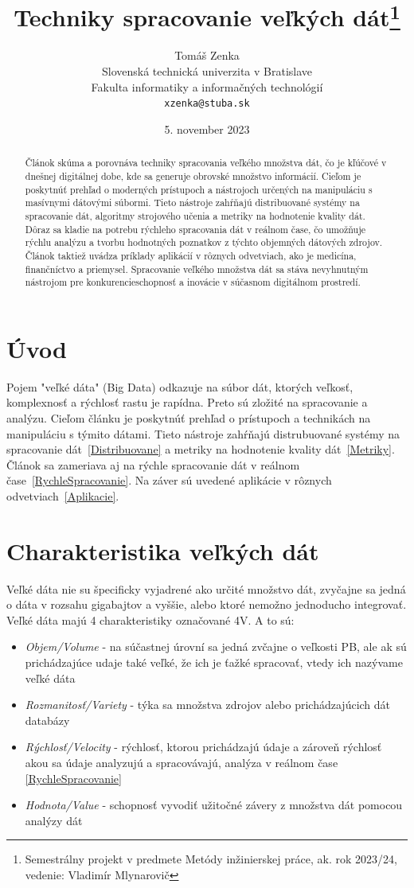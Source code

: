\documentclass[10pt,slovak,a4paper]{article}
\title{Techniky spracovanie veľkých dát\thanks{Semestrálny projekt v predmete Metódy inžinierskej práce, ak. rok 2023/24, vedenie: Vladimír Mlynarovič}} %
\author{Tomáš Zenka\\[2pt]
	{\small Slovenská technická univerzita v Bratislave}\\
	{\small Fakulta informatiky a informačných technológií}\\
	{\small \texttt{xzenka@stuba.sk}}
	}
\date{\small 5. november 2023} %
\begin{document}
\maketitle

\begin{abstract}
Článok skúma a porovnáva techniky spracovania veľkého množstva dát, čo je kľúčové v dnešnej digitálnej dobe, kde sa generuje obrovské množstvo informácií. Cieľom je poskytnúť prehľad o moderných prístupoch a nástrojoch určených na manipuláciu s masívnymi dátovými súbormi. Tieto nástroje zahŕňajú distribuované systémy na spracovanie dát, algoritmy strojového učenia a metriky na hodnotenie kvality dát. Dôraz sa kladie na potrebu rýchleho spracovania dát v reálnom čase, čo umožňuje rýchlu analýzu a tvorbu hodnotných poznatkov z týchto objemných dátových zdrojov. Článok taktiež uvádza príklady aplikácií v rôznych odvetviach, ako je medicína, finančníctvo a priemysel. Spracovanie veľkého množstva dát sa stáva nevyhnutným nástrojom pre konkurencieschopnosť a inovácie v súčasnom digitálnom prostredí.
\end{abstract}
\newpage


\section{Úvod}

Pojem "veľké dáta" (Big Data) odkazuje na súbor dát, ktorých veľkosť, komplexnosť a rýchlosť rastu je rapídna. Preto sú zložité na spracovanie a analýzu.\cite{ZakladneInfo} Cieľom článku je poskytnúť prehľad o prístupoch a technikách na manipuláciu s týmito dátami. Tieto nástroje zahŕňajú distrubuované systémy na spracovanie dát~\ref{Distribuovane}  a metriky na hodnotenie kvality dát~\ref{Metriky}. Článok sa zameriava aj na rýchle spracovanie dát v reálnom čase~\ref{RychleSpracovanie}. Na záver sú uvedené aplikácie v rôznych odvetviach~\ref{Aplikacie}.

\section{Charakteristika veľkých dát}
Veľké dáta nie su špecificky vyjadrené ako určité množstvo dát, zvyčajne sa jedná o dáta v rozsahu gigabajtov a vyššie, alebo ktoré nemožno jednoducho integrovať. Veľké dáta majú 4 charakteristiky označované 4V. A to sú:
\begin{itemize}
\item \emph {Objem/Volume} - na súčastnej úrovní sa jedná zvčajne o veľkosti PB, ale ak sú prichádzajúce udaje také veľké, že ich je ťažké spracovať, vtedy ich nazývame veľké dáta
\item \emph {Rozmanitosť/Variety} - týka sa množstva zdrojov alebo prichádzajúcich dát databázy
\item \emph {Rýchlosť/Velocity} - rýchlosť, ktorou prichádzajú údaje a zároveň rýchlosť akou sa údaje analyzujú a spracovávajú, analýza v reálnom čase \ref{RychleSpracovanie}
\item \emph {Hodnota/Value} - schopnosť vyvodiť užitočné závery z množstva dát pomocou analýzy dát
\end{itemize}
\cite{Charakteristika}
\end{document}
